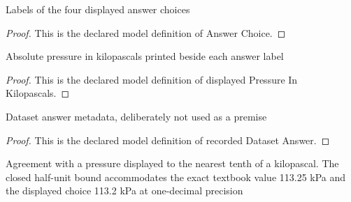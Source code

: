 \begin{definition}
  \label{def:physics:phyx-mini-0663:phyxminiproblems-problemphyxmini0663-answerchoice}
  Labels of the four displayed answer choices
\end{definition}
\begin{proof}
  This is the declared model definition of Answer Choice.
\end{proof}
\begin{definition}
  \label{def:physics:phyx-mini-0663:phyxminiproblems-problemphyxmini0663-displayedpressureinkilopascals}
  Absolute pressure in kilopascals printed beside each answer label
\end{definition}
\begin{proof}
  This is the declared model definition of displayed Pressure In Kilopascals.
\end{proof}
\begin{definition}
  \label{def:physics:phyx-mini-0663:phyxminiproblems-problemphyxmini0663-recordeddatasetanswer}
  Dataset answer metadata, deliberately not used as a premise
\end{definition}
\begin{proof}
  This is the declared model definition of recorded Dataset Answer.
\end{proof}
\begin{definition}
  \label{def:physics:phyx-mini-0663:phyxminiproblems-problemphyxmini0663-matchesdisplayedpressuretonearesttenth}
  Agreement with a pressure displayed to the nearest tenth of a kilopascal. The closed half-unit bound accommodates the exact textbook value 113.25 kPa and the displayed choice 113.2 kPa at one-decimal precision
\end{definition}
